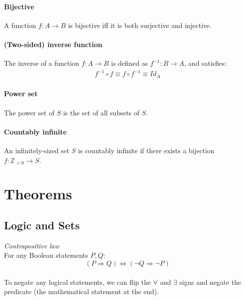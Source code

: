 \documentclass{scrartcl}
\newcommand{\Z}{\mathbb{Z}}
\begin{document}
\paragraph{Bijective}
A function $ f : A \to B $ is bijective iff it is both surjective and injective.
\paragraph{(Two-sided) inverse function}
The inverse of a function $ f : A \to B $ is defined as $ f^{-1} : B \to A $, and satisfies:
\begin{align}
f^{-1} \circ f \equiv f \circ f^{-1} \equiv Id_{A}
\end{align}
\paragraph{Power set}
The power set of $ S $ is the set of all subsets of $ S $.
\paragraph{Countably infinite}
An infinitely-sized set $ S $ is countably infinite if there exists a bijection $ f : \Z_{> 0} \to S $.

\section{Theorems}
\subsection{Logic and Sets}
\textit{Contrapositive law}
\\
For any Boolean statements $ P, Q $:
\begin{equation}
(P \Rightarrow Q) \Leftrightarrow (\neg Q \Rightarrow \neg P)
\end{equation}
\\
To negate any logical statements, we can flip the $ \forall $ and $ \exists $ signs and negate the predicate (the mathematical statement at the end).
\end{document}
